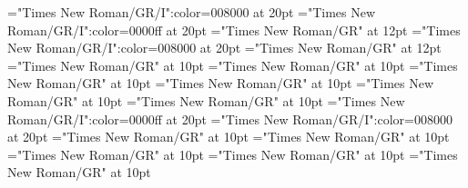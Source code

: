 \documentclass[a4paper]{article}
\begin{document}
\pagestyle{plain}
\sloppy
\setlength{\parfillskip}{0pt plus 1fil}
\font\pronunciationenUSpronunciationarticlebefore="Times New Roman/GR/I":color=008000 at 20pt
\font\pronunciationenUKpronunciationenUSbefore="Times New Roman/GR/I":color=0000ff at 20pt
\font\pronunciationenUSfirstoftypebefore="Times New Roman/GR" at 12pt
\font\pronunciationenUSpronunciationbefore="Times New Roman/GR/I":color=008000 at 20pt
\font\pronunciationenUSbefore="Times New Roman/GR" at 12pt
\font\sectionletterdictionary="Times New Roman/GR" at 10pt
\font\headsectionletterdictionary="Times New Roman/GR" at 10pt
\font\articledictionary="Times New Roman/GR" at 10pt
\font\headwordfirstoftypearticledictionary="Times New Roman/GR" at 10pt
\font\grammarrequiresfirstoftypearticledictionary="Times New Roman/GR" at 10pt
\font\relationsynonymfirstoftypearticledictionary="Times New Roman/GR" at 10pt
\font\pronunciationenUKarticledictionary="Times New Roman/GR/I":color=0000ff at 20pt
\font\pronunciationenUSarticledictionary="Times New Roman/GR/I":color=008000 at 20pt
\font\grammarcategoryfirstoftypearticledictionary="Times New Roman/GR" at 10pt
\font{}="Times New Roman/GR" at 10pt
\font\notefirstoftypearticledictionary="Times New Roman/GR" at 10pt
\font\exampleusearticledictionary="Times New Roman/GR" at 10pt
\font\examplearticledictionary="Times New Roman/GR" at 10pt

\mbox{} 
\newpage 
\newpage 
\setcounter{page}{1} 
\pagestyle{fancy} 


\end{document}

